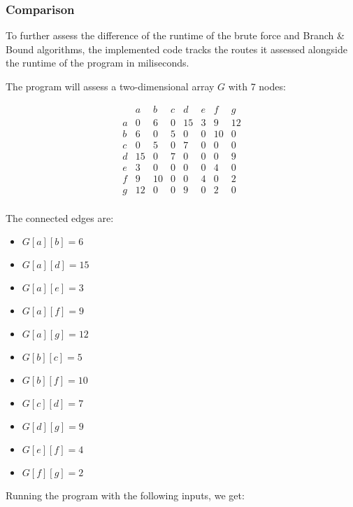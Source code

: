 \subsubsection{Comparison}

To further assess the difference of the runtime of the brute force and Branch \& Bound algorithms, the implemented code tracks the routes it assessed alongside the runtime of the program in miliseconds.

The program will assess a two-dimensional array $G$ with 7 nodes:

\[
\begin{array}{c|ccccccc}
    & a & b & c & d & e & f & g \\
\hline
a & 0 & 6  & 0  & 15 & 3  & 9  & 12  \\
b & 6  & 0  & 5  & 0  & 0  & 10 & 0  \\
c & 0  & 5  & 0  & 7  & 0  & 0  & 0  \\
d & 15 & 0  & 7  & 0  & 0  & 0  & 9  \\
e & 3  & 0  & 0  & 0  & 0  & 4  & 0  \\
f & 9  & 10 & 0  & 0  & 4  & 0  & 2  \\
g & 12  & 0  & 0  & 9  & 0  & 2  & 0 \\
\end{array}
\]

The connected edges are:
\begin{itemize}
    \item $G[a][b] = 6$
    \item $G[a][d] = 15$
    \item $G[a][e] = 3$
    \item $G[a][f] = 9$
    \item $G[a][g] = 12$
    \item $G[b][c] = 5$
    \item $G[b][f] = 10$
    \item $G[c][d] = 7$
    \item $G[d][g] = 9$
    \item $G[e][f] = 4$
    \item $G[f][g] = 2$
\end{itemize}

Running the program with the following inputs, we get:

